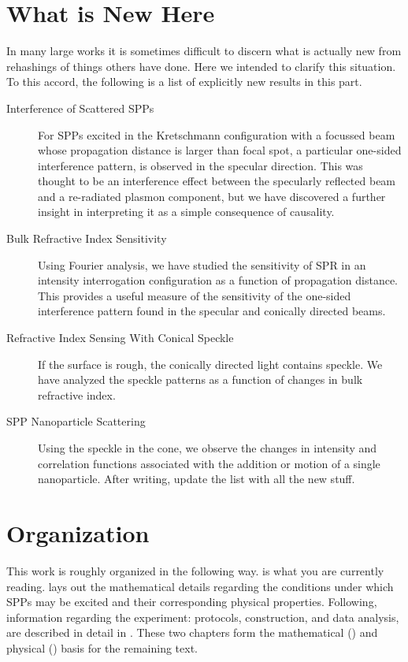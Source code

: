 \section{What is New Here}
In many large works it is sometimes difficult to discern what is actually
new from rehashings of things others have done.  Here we intended to clarify
this situation.  To this accord, the following is a list of explicitly new
results in this part.

\begin{description}
\item[{Interference of Scattered SPPs}]
For SPPs excited in the Kretschmann configuration with a focussed beam
whose propagation distance is larger than focal spot, a particular one-sided
interference pattern, is observed in the specular direction.  This was
thought to be an interference effect between the specularly reflected beam
and a re-radiated plasmon component, but we have discovered a further
insight in interpreting it as a simple consequence of causality.
\item[{Bulk Refractive Index Sensitivity}] 
Using Fourier analysis, we have studied the sensitivity of SPR in an intensity
interrogation configuration as a function of propagation distance.  This
provides a useful measure of the sensitivity of the one-sided interference
pattern found in the specular and conically directed beams.
\item[{Refractive Index Sensing With Conical Speckle}]
If the surface is rough, the conically directed light contains speckle.  We
have analyzed the speckle patterns as a function of changes in bulk
refractive index.
\item[{SPP Nanoparticle Scattering}]
Using the speckle in the cone, we observe the changes in intensity and
correlation functions associated with the addition or motion of a single
nanoparticle.
After writing, update the list with all the new stuff.
\end{description}

\section{Organization}
This work is roughly organized in the following way.  
is what you are currently reading.   lays out the
mathematical details regarding the conditions under which SPPs may be
excited and their corresponding physical properties.  Following,
information regarding the experiment: protocols, construction, and data
analysis, are described in detail in .  These two
chapters form the mathematical () and physical
() basis for the remaining text.

